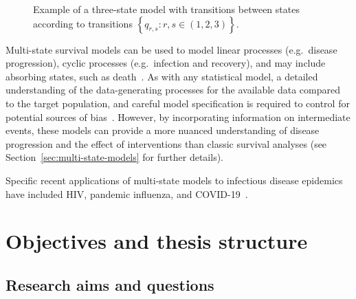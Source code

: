 \begin{figure}[htbp!]
  \centering

  \caption[Example of a three-state model]{Example of a three-state model with transitions between states according to transitions $\left\{q_{r,s} : r,s \in (1,2,3)\right\}$.}\label{fig:basic-msm}
\end{figure}

Multi-state survival models can be used to model linear processes (e.g.\ disease progression), cyclic processes (e.g.\ infection and recovery), and may include absorbing states, such as death~\parencite{Andersen2002-uv}. As with any statistical model, a detailed understanding of the data-generating processes for the available data compared to the target population, and careful model specification is required to control for potential sources of bias~\parencite{Westreich2012-kq}. However, by incorporating information on intermediate events, these models can provide a more nuanced understanding of disease progression and the effect of interventions than classic survival analyses (see Section~\ref{sec:multi-state-models} for further details).

Specific recent applications of multi-state models to infectious disease epidemics have included HIV, pandemic influenza, and COVID-19~\parencite{Brizzi2019-yj, Birrell2021-ou, Corbella2018-ka, Presanis2021-pv, Jackson2022-lt}.

\section{Objectives and thesis structure}

\subsection{Research aims and questions}

